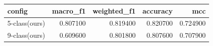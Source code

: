 \begin{tabular}{lrrrr}
\toprule
config & macro\_f1 & weighted\_f1 & accuracy & mcc \\
\midrule
5-class(ours) & 0.807100 & 0.819400 & 0.820700 & 0.724900 \\
9-class(ours) & 0.609600 & 0.801800 & 0.807600 & 0.707900 \\
\bottomrule
\end{tabular}

